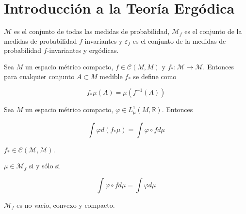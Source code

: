 \section{Introducción a la Teoría Ergódica}

\begin{definicion}
	$\mathcal{M}$ es el conjunto de todas las medidas de probabilidad, $\mathcal{M}_f$ es el conjunto de la medidas de probabilidad $f$-invariantes y $\varepsilon_f$ es el conjunto de la medidas de probabilidad $f$-invariantes y ergódicas.
\end{definicion}

\begin{definicion}
	Sea $M$ un espacio métrico compacto, $f \in \mathcal{C}(M,M)$ y $f_*: \mathcal{M} \rightarrow \mathcal{M}$. Entonces para cualquier conjunto $A \subset M$ medible $f_*$ se define como
	
	\begin{equation}
		f_*\mu(A) = \mu(f^{-1}(A))
	\end{equation}
\end{definicion}

\begin{lema}\label{lema1_krylov-bugoliubov}
	Sea $M$ un espacio métrico compacto, $\varphi \in L^1_\mu (M,\mathbb{R})$. Entonces
	
	\begin{equation}
		\int \varphi d(f_*\mu)=\int \varphi \circ f d\mu
	\end{equation}
\end{lema}

\begin{lema}
	$f_* \in \mathcal{C}(\mathcal{M},\mathcal{M})$. 
\end{lema}

\begin{lema}\label{lema3_krylov}
	$\mu \in \mathcal{M}_f$ si y sólo si
	
	\begin{equation}
		\int \varphi \circ f d\mu = \int \varphi d\mu
	\end{equation}
\end{lema}

\begin{teorema}
	$\mathcal{M}_f$ es no vacío, convexo y compacto.
\end{teorema}

